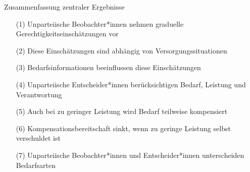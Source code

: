 \documentclass[xcolor=table,9pt,aspectratio=169]{beamer}
\begin{document}
\begin{frame}{\vspace*{10mm}Zusammenfassung zentraler Ergebnisse}
\vspace*{-10mm}
\begin{itemize}
   \item[(1)] Unparteiische Beobachter*innen nehmen graduelle Gerechtigkeitseinschätzungen vor
   \item[(2)] Diese Einschätzungen sind abhängig von Versorgungssituationen
   \item[(3)] Bedarfsinformationen beeinflussen diese Einschätzungen
\end{itemize}

\vspace{1em}
\begin{itemize}
   \item[(4)] Unparteiische Entscheider*innen berücksichtigen Bedarf, Leistung und Verantwortung
   \item[(5)] Auch bei zu geringer Leistung wird Bedarf teilweise kompensiert
   \item[(6)] Kompensationsbereitschaft sinkt, wenn zu geringe Leistung selbst verschuldet ist
\end{itemize}

\vspace{1em}
\begin{itemize}
   \item[(7)] Unparteiische Beobachter*innen und Entscheider*innen unterscheiden Bedarfsarten
\end{itemize}
\end{frame}
\end{document}
